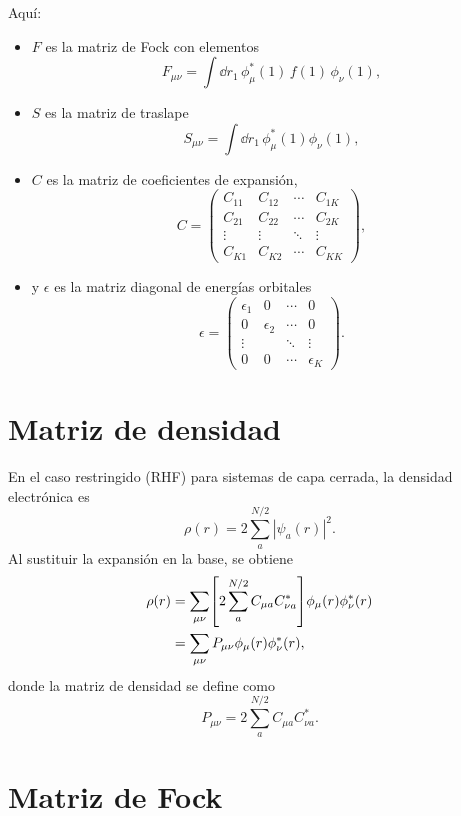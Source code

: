 \documentclass[11pt]{article}
\begin{document}
Aquí:
\begin{itemize}
\item \( F \) es la matriz de Fock con elementos
\[
F_{\mu\nu} = \int \dd{r_1}\,\phi_\mu^*(1)\,f(1)\,\phi_\nu(1),
\]
\item \( S \) es la matriz de traslape
\[
S_{\mu\nu} = \int \dd{r_1}\,\phi_\mu^*(1)\phi_\nu(1),
\]
\item \( C \) es la matriz de coeficientes de expansión,
\[
C = 
\begin{pmatrix}
C_{11} & C_{12} & \cdots & C_{1K} \\
C_{21} & C_{22} & \cdots & C_{2K} \\
\vdots & \vdots & \ddots & \vdots \\
C_{K1} & C_{K2} & \cdots & C_{KK}
\end{pmatrix},
\]
\item y \( \epsilon \) es la matriz diagonal de energías orbitales
\[
\epsilon = 
\begin{pmatrix}
\epsilon_1 & 0 & \cdots & 0 \\
0 & \epsilon_2 & \cdots & 0 \\
\vdots & & \ddots & \vdots \\
0 & 0 & \cdots & \epsilon_K
\end{pmatrix}.
\]
\end{itemize}

\section{Matriz de densidad}
\label{sec:density}

En el caso restringido (RHF) para sistemas de capa cerrada, la densidad electrónica es
\[
\rho(r) = 2\sum_{a}^{N/2}|\psi_a(r)|^2.
\]
Al sustituir la expansión en la base, se obtiene
\begin{align*}
\rho(r)
&= \sum_{\mu\nu}\!\qty[2\sum_a^{N/2}C_{\mu a}C_{\nu a}^*]\phi_\mu(r)\phi_\nu^*(r) \\
&= \sum_{\mu\nu}P_{\mu\nu}\phi_\mu(r)\phi_\nu^*(r),
\end{align*}
donde la matriz de densidad se define como
\begin{equation}
\label{eq:Pmat}
\boxed{P_{\mu\nu} = 2\sum_a^{N/2} C_{\mu a}C_{\nu a}^*.}
\end{equation}

\section{Matriz de Fock}
\label{sec:fock}
\end{document}
